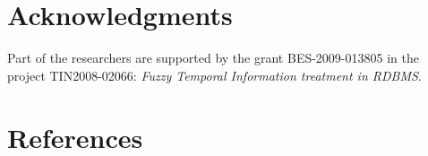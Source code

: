 \documentclass[11pt,twoside]{article}
\def\labart{yourLabel}      %
\begin{document}
\begin{multicols}{2}
%
%
%
%
%

\section*{Acknowledgments}
Part of the researchers are supported by the grant BES-2009-013805 in the project TIN2008-02066: \emph{Fuzzy Temporal Information treatment in RDBMS}.


\section*{References}



\end{multicols}
\end{document}
